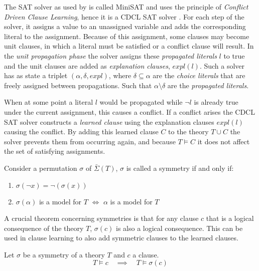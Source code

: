 	The SAT solver as used by \cite{devriendt2012symmetry} is called MiniSAT
	\cite{een2004extensible} and uses the principle of \emph{Conflict Driven Clause Learning}, hence
	it is a CDCL SAT solver \cite{zhang2001efficient}.
	For each step of the solver, it assigns a value to an unassigned variable and adds the
	corresponding literal to the assignment.
	Because of this assignment, some clauses may become unit clauses, in which a literal must be
	satisfied or a conflict clause will result.
	In the \emph{unit propagation phase} the solver assigns these \emph{propagated literals} $l$ to
	true and the unit clauses are added as \emph{explanation clauses}, $expl(l)$.
	Such a solver has as state a triplet $(\alpha, \delta, expl)$,
	where $\delta\subseteq \alpha$ are the \emph{choice literals} that are freely assigned between
	propagations.
	Such that $\alpha \setminus \delta$ are the \emph{propagated literals}.

	When at some point a literal $l$ would be propagated while $\neg l$ is already true under the
	current assignment, this causes a conflict.
	If a conflict arises the CDCL SAT solver constructs a \emph{learned clause} using the
	explanation clauses $expl(l)$ causing the conflict.
	By adding this learned clause $C$ to the theory $T \cup C$ the solver prevents them from
	occurring again, and because $T \models C$ it does not affect the set of satisfying assignments.

	Consider a permutation $\sigma$ of $\bar\Sigma(T)$, $\sigma$ is called a symmetry if and only
	if:
	\begin{enumerate}
		\item $\sigma(\neg x) = \neg(\sigma( x ))$
		\item $\sigma(\alpha )$ is a model for $T$ $\Leftrightarrow$ $\alpha$ is a model for $T$
	\end{enumerate}

	A crucial theorem concerning symmetries is that for any clause $c$ that is a logical consequence
	of the theory $T$, $\sigma(c)$ is also a logical consequence.
	This can be used in clause learning to also add symmetric clauses to the learned clauses.\\

	\begin{proposition}
		\label{prop:symmetric_clause_learning}
		Let $\sigma$ be a symmetry of a theory $T$ and $c$ a clause.
		\begin{equation}
			T \models c \quad \implies \quad T \models \sigma( c )
		\end{equation}
	\end{proposition}

